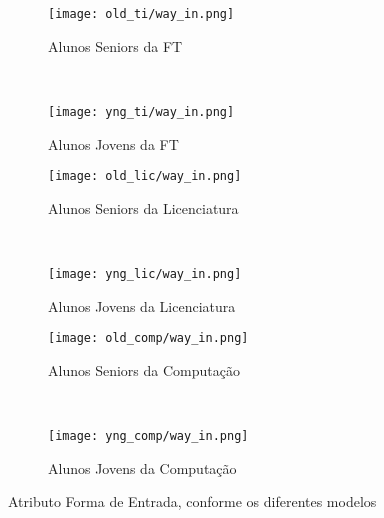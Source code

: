 \clearpage
\begin{figure}[!ht]
    \centering
    \begin{subfigure}[b]{0.48\textwidth}
        \centering
        \texttt{[image: old\_ti/way\_in.png]}
        \caption{Alunos Seniors da FT}
    \end{subfigure}
    ~
    \begin{subfigure}[b]{0.48\textwidth}
        \centering
        \texttt{[image: yng\_ti/way\_in.png]}
        \caption{Alunos Jovens da FT}
    \end{subfigure}

    \begin{subfigure}[b]{0.48\textwidth}
        \centering
        \texttt{[image: old\_lic/way\_in.png]}
        \caption{Alunos Seniors da Licenciatura}
    \end{subfigure}
    ~
    \begin{subfigure}[b]{0.48\textwidth}
        \centering
        \texttt{[image: yng\_lic/way\_in.png]}
        \caption{Alunos Jovens da Licenciatura}
    \end{subfigure}

    \begin{subfigure}[b]{0.48\textwidth}
        \centering
        \texttt{[image: old\_comp/way\_in.png]}
        \caption{Alunos Seniors da Computação}
    \end{subfigure}
    ~
    \begin{subfigure}[b]{0.48\textwidth}
        \centering
        \texttt{[image: yng\_comp/way\_in.png]}
        \caption{Alunos Jovens da Computação}
    \end{subfigure}
    \caption{Atributo Forma de Entrada, conforme os diferentes modelos}
\end{figure}

